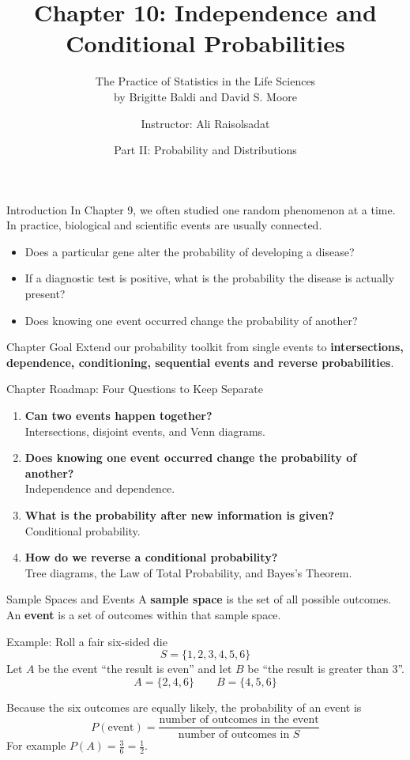 \documentclass[aspectratio=169]{beamer}
\title[Chapter 10: Independence \& Conditional Probabilities]{\textbf{Chapter 10: Independence and Conditional Probabilities}}
\subtitle{The Practice of Statistics in the Life Sciences \\ by Brigitte Baldi and David S. Moore}
\author{Instructor: Ali Raisolsadat}
\date{Part II: Probability and Distributions}
\begin{document}
\begin{frame}
\titlepage
\end{frame}

\begin{frame}{Introduction}
In Chapter 9, we often studied one random phenomenon at a time. In practice, biological and scientific events are usually connected.
\vspace{0.2cm}
\begin{itemize}
	\item Does a particular gene alter the probability of developing a disease?
	\item If a diagnostic test is positive, what is the probability the disease is actually present?
	\item Does knowing one event occurred change the probability of another?
\end{itemize}
\vspace{0.2cm}
\begin{block}{Chapter Goal}
Extend our probability toolkit from single events to \textbf{intersections, dependence, conditioning, sequential events and reverse probabilities}.
\end{block}
\end{frame}

\begin{frame}{Chapter Roadmap: Four Questions to Keep Separate}
\begin{enumerate}
	\item \textbf{Can two events happen together?}\\
	Intersections, disjoint events, and Venn diagrams.
	\item \textbf{Does knowing one event occurred change the probability of another?}\\
          Independence and dependence.
	\item \textbf{What is the probability after new information is given?}\\
          Conditional probability.
   	 \item \textbf{How do we reverse a conditional probability?}\\
          Tree diagrams, the Law of Total Probability, and Bayes's Theorem.
\end{enumerate}
\end{frame}

\begin{frame}{Sample Spaces and Events}
A \textbf{sample space} is the set of all possible outcomes. An \textbf{event} is a set of outcomes within that sample space.
\begin{block}{Example: Roll a fair six-sided die}
$$S=\{1,2,3,4,5,6\}$$
Let $A$ be the event ``the result is even'' and let $B$ be ``the result is greater than $3$''.
$$A=\{2,4,6\} \qquad B=\{4,5,6\}$$
\end{block}

Because the six outcomes are equally likely, the probability of an event is
\[
P(\text{event})=\frac{\text{number of outcomes in the event}}{\text{number of outcomes in }S}
\]
For example $P(A)=\frac{3}{6}=\frac{1}{2}$.
\end{frame}
\end{document}
